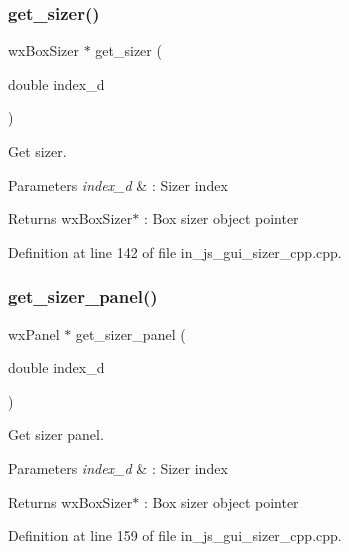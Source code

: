\subsubsection{get\_sizer()}
{\footnotesize\ttfamily wx\+Box\+Sizer $\ast$ get\+\_\+sizer (\begin{DoxyParamCaption}\item[{double}]{index\+\_\+d }\end{DoxyParamCaption})}



Get sizer. 


\begin{DoxyParams}{Parameters}
{\em index\+\_\+d} & \+: Sizer index \\
\hline
\end{DoxyParams}
\begin{DoxyReturn}{Returns}
wx\+Box\+Sizer$\ast$ \+: Box sizer object pointer 
\end{DoxyReturn}


Definition at line 142 of file in\+\_\+js\+\_\+gui\+\_\+sizer\+\_\+cpp.\+cpp.

\mbox{\label{group___sizer_ga505e8cc5282fc14f547b1da967ebc44a}} 
\subsubsection{get\_sizer\_panel()}
{\footnotesize\ttfamily wx\+Panel $\ast$ get\+\_\+sizer\+\_\+panel (\begin{DoxyParamCaption}\item[{double}]{index\+\_\+d }\end{DoxyParamCaption})}



Get sizer panel. 


\begin{DoxyParams}{Parameters}
{\em index\+\_\+d} & \+: Sizer index \\
\hline
\end{DoxyParams}
\begin{DoxyReturn}{Returns}
wx\+Box\+Sizer$\ast$ \+: Box sizer object pointer 
\end{DoxyReturn}


Definition at line 159 of file in\+\_\+js\+\_\+gui\+\_\+sizer\+\_\+cpp.\+cpp.

\mbox{\label{group___sizer_gac715b4a43bb361fc96ce6f1b50d68a8b}} 
